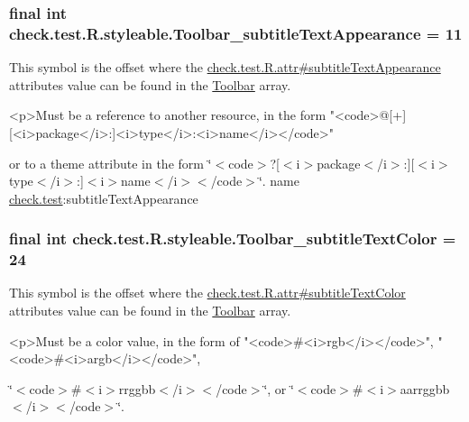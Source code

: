 \subsubsection[{Toolbar\+\_\+subtitle\+Text\+Appearance}]{\setlength{\rightskip}{0pt plus 5cm}final int check.\+test.\+R.\+styleable.\+Toolbar\+\_\+subtitle\+Text\+Appearance = 11\hspace{0.3cm}{\ttfamily [static]}}\label{classcheck_1_1test_1_1_r_1_1styleable_a144e9a2b2baf47ad3bc709462b1a5bbb}
This symbol is the offset where the \hyperlink{classcheck_1_1test_1_1_r_1_1attr_ae5a7dacf52c904d4e7fdc131f9f9c67a}{check.\+test.\+R.\+attr\#subtitle\+Text\+Appearance} attribute\textquotesingle{}s value can be found in the \hyperlink{classcheck_1_1test_1_1_r_1_1styleable_a1a7fa90223693abef77e7484cca2df54}{Toolbar} array.

\begin{DoxyVerb}      <p>Must be a reference to another resource, in the form "<code>@[+][<i>package</i>:]<i>type</i>:<i>name</i></code>"
\end{DoxyVerb}
 or to a theme attribute in the form \char`\"{}$<$code$>$?\mbox{[}$<$i$>$package$<$/i$>$\+:\mbox{]}\mbox{[}$<$i$>$type$<$/i$>$\+:\mbox{]}$<$i$>$name$<$/i$>$$<$/code$>$\char`\"{}.  name \hyperlink{namespacecheck_1_1test}{check.\+test}\+:subtitle\+Text\+Appearance \hypertarget{classcheck_1_1test_1_1_r_1_1styleable_ac4cc2a3f74200eb561317a2f73280838}{}
\subsubsection[{Toolbar\+\_\+subtitle\+Text\+Color}]{\setlength{\rightskip}{0pt plus 5cm}final int check.\+test.\+R.\+styleable.\+Toolbar\+\_\+subtitle\+Text\+Color = 24\hspace{0.3cm}{\ttfamily [static]}}\label{classcheck_1_1test_1_1_r_1_1styleable_ac4cc2a3f74200eb561317a2f73280838}
This symbol is the offset where the \hyperlink{classcheck_1_1test_1_1_r_1_1attr_ae5402664969908118713cc1f648a3312}{check.\+test.\+R.\+attr\#subtitle\+Text\+Color} attribute\textquotesingle{}s value can be found in the \hyperlink{classcheck_1_1test_1_1_r_1_1styleable_a1a7fa90223693abef77e7484cca2df54}{Toolbar} array.

\begin{DoxyVerb}      <p>Must be a color value, in the form of "<code>#<i>rgb</i></code>", "<code>#<i>argb</i></code>",
\end{DoxyVerb}
 \char`\"{}$<$code$>$\#$<$i$>$rrggbb$<$/i$>$$<$/code$>$\char`\"{}, or \char`\"{}$<$code$>$\#$<$i$>$aarrggbb$<$/i$>$$<$/code$>$\char`\"{}. 

